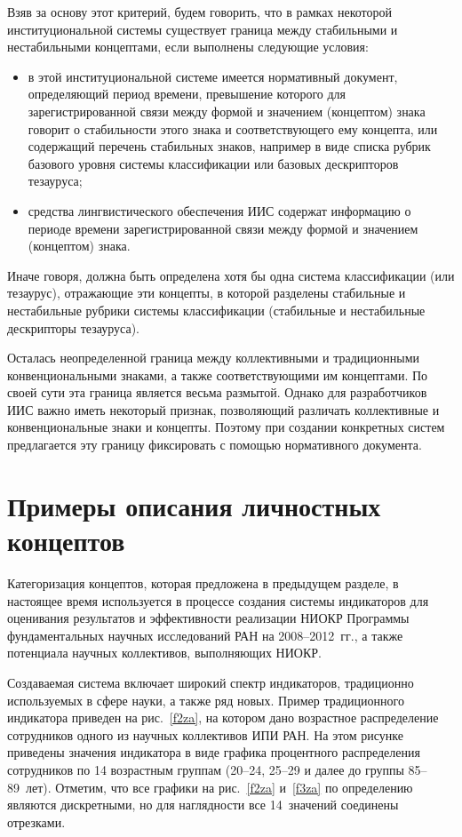 \begin{multicols}{2}
   Взяв за основу этот критерий, будем говорить, что в рамках некоторой
институциональной сис\-те\-мы существует граница между стабильными и нестабильными
концептами, если выполнены следующие условия:
   \begin{itemize}
\item в этой институциональной системе имеется нормативный документ,
определяющий период времени, превышение которого для зарегистрированной связи
между формой и значением (концептом) знака говорит о стабильности этого знака и
соответствующего ему концепта, или содержащий перечень стабильных знаков,
например в виде списка рубрик базового уровня системы классификации или базовых
дескрипторов тезауруса;
\item средства лингвистического обеспечения ИИС содержат информацию о периоде
времени зарегистрированной связи между формой и значением (концептом) знака.
   \end{itemize}

   Иначе говоря, должна быть определена хотя бы одна система классификации (или
тезаурус), отражающие эти концепты, в которой разделены стабильные и нестабильные
рубрики системы классификации (стабильные и нестабильные дескрипторы тезауруса).

   Осталась неопределенной граница между коллективными и традиционными
конвенциональными знаками, а также соответствующими им концептами. По своей сути эта
граница является весьма размытой. Однако для разработчиков ИИС важно иметь некоторый
признак, позволяющий различать коллективные и конвенциональные знаки и кон\-цеп\-ты.
Поэтому при создании конкретных систем предлагается эту границу фиксировать с помощью
нормативного документа.

\vspace*{-6pt}

\section{Примеры описания личностных концептов}

   Категоризация концептов, которая предложена в предыду\-щем разделе, в настоящее время
используется в процессе создания системы индикаторов для оценивания результатов и
эффективности реализации НИОКР Программы фундаментальных научных исследований
РАН на 2008--2012~гг., а также потенциала научных коллективов, вы\-пол\-ня\-ющих НИОКР.

   Создаваемая система включает широкий спектр индикаторов, традиционно используемых
в сфере науки, а также ряд новых. Пример традиционного индикатора приведен на
рис.~\ref{f2za}, на котором дано возрастное распределение сотрудников одного из научных
коллективов ИПИ РАН. На этом рисунке приведены значения индикатора в виде графика
процентного распределения сотрудников по 14 возрастным группам (20--24, 25--29 и далее
до группы 85--89~лет). Отметим, что все графики на рис.~\ref{f2za} и~\ref{f3za} по
определению являются дискретными, но для наглядности все 14~значений соединены
отрезками.


\end{multicols}
